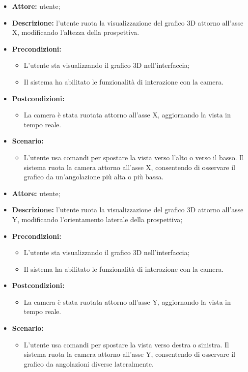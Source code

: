 \begin{itemize}
    \item \textbf{Attore:} utente;
    \item \textbf{Descrizione:} l'utente ruota la visualizzazione del grafico 3D attorno all'asse X, modificando l'altezza della prospettiva.
    \item \textbf{Precondizioni:} 
    \begin{itemize}
        \item L'utente sta visualizzando il grafico 3D nell'interfaccia;
        \item Il sistema ha abilitato le funzionalità di interazione con la camera.
    \end{itemize}
    \item \textbf{Postcondizioni:} 
    \begin{itemize}
        \item La camera è stata ruotata attorno all'asse X, aggiornando la vista in tempo reale.
    \end{itemize}
    \item \textbf{Scenario:}
    \begin{itemize}
        \item L'utente usa comandi per spostare la vista verso l'alto o verso il basso. Il sistema ruota la camera attorno all'asse X, consentendo di osservare il grafico da un'angolazione più alta o più bassa.
    \end{itemize}
    
\end{itemize}
\begin{itemize}
    \item \textbf{Attore:} utente;
    \item \textbf{Descrizione:} l'utente ruota la visualizzazione del grafico 3D attorno all'asse Y, modificando l'orientamento laterale della prospettiva;
    \item \textbf{Precondizioni:} 
    \begin{itemize}
        \item L'utente sta visualizzando il grafico 3D nell'interfaccia;
        \item Il sistema ha abilitato le funzionalità di interazione con la camera.
    \end{itemize}
    \item \textbf{Postcondizioni:} 
    \begin{itemize}
        \item La camera è stata ruotata attorno all'asse Y, aggiornando la vista in tempo reale.
    \end{itemize}
    \item \textbf{Scenario:} 
    \begin{itemize}
        \item L'utente usa comandi per spostare la vista verso destra o sinistra. Il sistema ruota la camera attorno all'asse Y, consentendo di osservare il grafico da angolazioni diverse lateralmente.
    \end{itemize}
\end{itemize}



